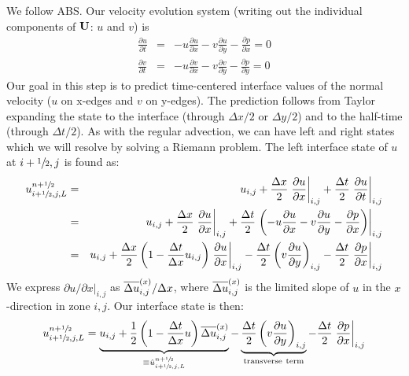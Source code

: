We follow ABS.  Our velocity evolution system (writing out the
individual components of ${\bf U}$: $u$ and $v$) is
\begin{eqnarray}
\frac{\partial u}{\partial t} &=& -u \frac{\partial u}{\partial x} 
                                  -v \frac{\partial u}{\partial y} 
                                  -\frac{\partial p}{\partial x} = 0 \\
\frac{\partial v}{\partial t} &=& -u \frac{\partial v}{\partial x} 
                                  -v \frac{\partial v}{\partial y} 
                                  -\frac{\partial p}{\partial y} = 0 
\end{eqnarray}
Our goal in this step is to predict time-centered interface values of
the normal velocity ($u$ on x-edges and $v$ on y-edges).  The
prediction follows from Taylor expanding the state to the interface
(through $\Delta x/2$ or $\Delta y/2$) and to the half-time (through
$\Delta t/2$).  As with the regular advection, we can have left and
right states which we will resolve by solving a Riemann problem.  The
left interface state of $u$ at $i+{\sfrac{1}{2}},j$ is found as:
\begin{eqnarray}
u_{i+{\sfrac{1}{2}},j,L}^{n+{\sfrac{1}{2}}} 
  &=& u_{i,j} 
    + \frac{\Delta x}{2} \left . \frac{\partial u}{\partial x} \right |_{i,j}
    + \frac{\Delta t}{2} \left . \frac{\partial u}{\partial t} \right |_{i,j}\\
  &=& u_{i,j} 
    + \frac{\Delta x}{2} \left . \frac{\partial u}{\partial x} \right |_{i,j}
    + \frac{\Delta t}{2} \left . \left (-u \frac{\partial u}{\partial x}
                                -v \frac{\partial u}{\partial y}
                                -\frac{\partial p}{\partial x} \right ) \right |_{i,j}\\
  &=& u_{i,j} 
    + \frac{\Delta x}{2} \left ( 1 - \frac{\Delta t}{\Delta x} u_{i,j} \right )
                         \left .  \frac{\partial u}{\partial x}\right |_{i,j}
    - \frac{\Delta t}{2} \left ( v \frac{\partial u}{\partial y}\right )_{i,j}
    - \frac{\Delta t}{2} \left . \frac{\partial p}{\partial x} \right |_{i,j}\\
\end{eqnarray}
We express ${\partial u}/{\partial x} |_{i,j}$ as $\overline{\Delta u}^{(x)}_{i,j} / \Delta
x$, where $\overline{\Delta u}^{(x)}_{i,j}$ is the limited slope of $u$ in the
$x$-direction in zone $i,j$.  Our interface state is then:
\begin{equation}
u_{i+{\sfrac{1}{2}},j,L}^{n+{\sfrac{1}{2}}} 
    = \underbrace{u_{i,j} + \frac{1}{2} \left ( 1 - \frac{\Delta t}{\Delta x} u \right ) \overline{\Delta u}^{(x)}_{i,j}}_{\equiv \hat{u}_{i+{\sfrac{1}{2}},j,L}^{n+{\sfrac{1}{2}}}}
    - \underbrace{\frac{\Delta t}{2} \left ( v \frac{\partial u}{\partial y} \right )_{i,j}}_{\mathrm{transverse~term}}
    - \frac{\Delta t}{2} \left . \frac{\partial p}{\partial x} \right |_{i,j}
\label{eq:uMAC_l}
\end{equation} 


